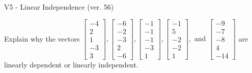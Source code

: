 \begin{exercise}
  \begin{exerciseTitle}V5 - Linear Independence (ver. 56)\end{exerciseTitle}
  \begin{exerciseStatement}
    Explain why the vectors \(\left[\begin{array}{r}
-4 \\
2 \\
1 \\
-3 \\
3
\end{array}\right] , \left[\begin{array}{r}
-6 \\
-2 \\
-3 \\
2 \\
-6
\end{array}\right] , \left[\begin{array}{r}
-1 \\
-1 \\
-1 \\
-3 \\
1
\end{array}\right] , \left[\begin{array}{r}
-1 \\
5 \\
-2 \\
-2 \\
1
\end{array}\right] , \text{ and } \left[\begin{array}{r}
-9 \\
-7 \\
-8 \\
4 \\
-14
\end{array}\right]\) are linearly dependent or linearly independent.	



\end{exerciseStatement}
\end{exercise}
